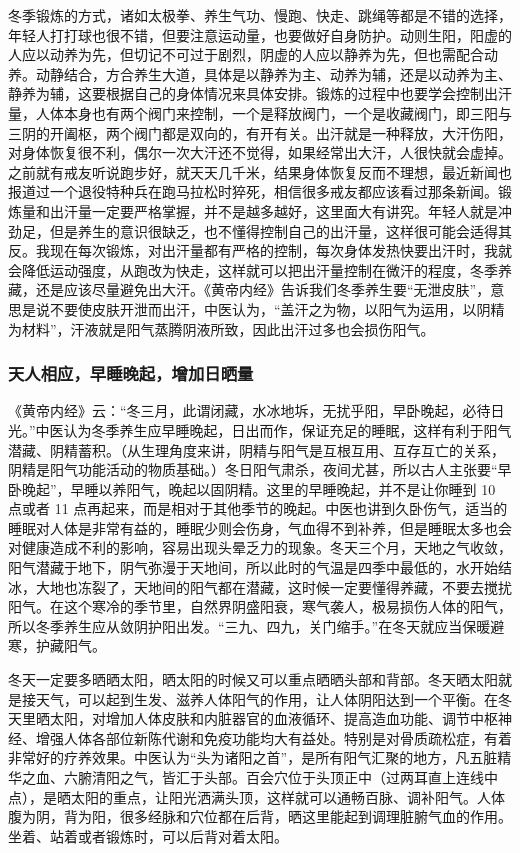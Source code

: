 冬季锻炼的方式，诸如太极拳、养生气功、慢跑、快走、跳绳等都是不错的选择，年轻人打打球也很不错，但要注意运动量，也要做好自身防护。动则生阳，阳虚的人应以动养为先，但切记不可过于剧烈，阴虚的人应以静养为先，但也需配合动养。动静结合，方合养生大道，具体是以静养为主、动养为辅，还是以动养为主、静养为辅，这要根据自己的身体情况来具体安排。锻炼的过程中也要学会控制出汗量，人体本身也有两个阀门来控制，一个是释放阀门，一个是收藏阀门，即三阳与三阴的开阖枢，两个阀门都是双向的，有开有关。出汗就是一种释放，大汗伤阳，对身体恢复很不利，偶尔一次大汗还不觉得，如果经常出大汗，人很快就会虚掉。之前就有戒友听说跑步好，就天天几千米，结果身体恢复反而不理想，最近新闻也报道过一个退役特种兵在跑马拉松时猝死，相信很多戒友都应该看过那条新闻。锻炼量和出汗量一定要严格掌握，并不是越多越好，这里面大有讲究。年轻人就是冲劲足，但是养生的意识很缺乏，也不懂得控制自己的出汗量，这样很可能会适得其反。我现在每次锻炼，对出汗量都有严格的控制，每次身体发热快要出汗时，我就会降低运动强度，从跑改为快走，这样就可以把出汗量控制在微汗的程度，冬季养藏，还是应该尽量避免出大汗。《黄帝内经》告诉我们冬季养生要“无泄皮肤”，意思是说不要使皮肤开泄而出汗，中医认为，“盖汗之为物，以阳气为运用，以阴精为材料”，汗液就是阳气蒸腾阴液所致，因此出汗过多也会损伤阳气。

\subsubsection{天人相应，早睡晚起，增加日晒量}

《黄帝内经》云：“冬三月，此谓闭藏，水冰地坼，无扰乎阳，早卧晚起，必待日光。”中医认为冬季养生应早睡晚起，日出而作，保证充足的睡眠，这样有利于阳气潜藏、阴精蓄积。（从生理角度来讲，阴精与阳气是互根互用、互存互亡的关系，阴精是阳气功能活动的物质基础。）冬日阳气肃杀，夜间尤甚，所以古人主张要“早卧晚起”，早睡以养阳气，晚起以固阴精。这里的早睡晚起，并不是让你睡到 10 点或者 11 点再起来，而是相对于其他季节的晚起。中医也讲到久卧伤气，适当的睡眠对人体是非常有益的，睡眠少则会伤身，气血得不到补养，但是睡眠太多也会对健康造成不利的影响，容易出现头晕乏力的现象。冬天三个月，天地之气收敛，阳气潜藏于地下，阴气弥漫于天地间，所以此时的气温是四季中最低的，水开始结冰，大地也冻裂了，天地间的阳气都在潜藏，这时候一定要懂得养藏，不要去搅扰阳气。在这个寒冷的季节里，自然界阴盛阳衰，寒气袭人，极易损伤人体的阳气，所以冬季养生应从敛阴护阳出发。“三九、四九，关门缩手。”在冬天就应当保暖避寒，护藏阳气。

冬天一定要多晒晒太阳，晒太阳的时候又可以重点晒晒头部和背部。冬天晒太阳就是接天气，可以起到生发、滋养人体阳气的作用，让人体阴阳达到一个平衡。在冬天里晒太阳，对增加人体皮肤和内脏器官的血液循环、提高造血功能、调节中枢神经、增强人体各部位新陈代谢和免疫功能均大有益处。特别是对骨质疏松症，有着非常好的疗养效果。中医认为“头为诸阳之首”，是所有阳气汇聚的地方，凡五脏精华之血、六腑清阳之气，皆汇于头部。百会穴位于头顶正中（过两耳直上连线中点），是晒太阳的重点，让阳光洒满头顶，这样就可以通畅百脉、调补阳气。人体腹为阴，背为阳，很多经脉和穴位都在后背，晒这里能起到调理脏腑气血的作用。坐着、站着或者锻炼时，可以后背对着太阳。

